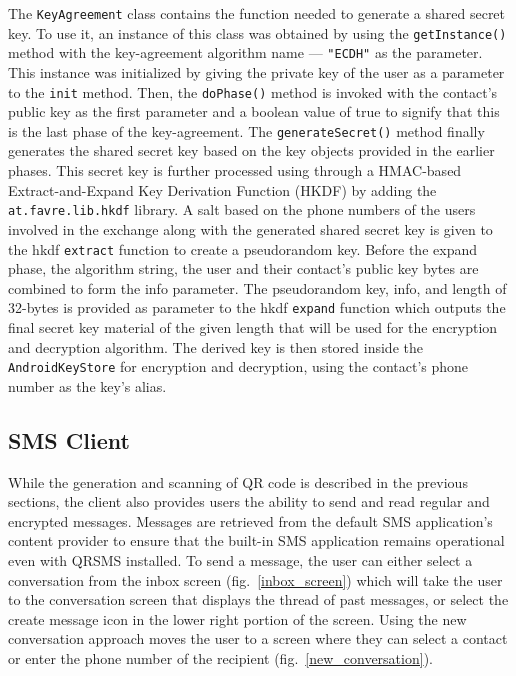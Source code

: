 \documentclass{report}
\begin{document}
The \texttt{KeyAgreement} class contains the function needed to generate a shared secret key. To use it, an instance of this class was obtained by using the \texttt{getInstance()} method with the key-agreement algorithm name --- \texttt{"ECDH"} as the parameter. This instance was initialized by giving the private key of the user as a parameter to the \texttt{init} method. Then, the \texttt{doPhase()} method is invoked with the contact's public key as the first parameter and a boolean value of true to signify that this is the last phase of the key-agreement. The \texttt{generateSecret()} method finally generates the shared secret key based on the key objects provided in the earlier phases. This secret key is further processed using through a HMAC-based Extract-and-Expand Key Derivation Function (HKDF) by adding the \texttt{at.favre.lib.hkdf} library. A salt based on the phone numbers of the users involved in the exchange along with the generated shared secret key is given to the hkdf \texttt{extract} function to create a pseudorandom key. Before the expand phase, the algorithm string, the user and their contact's public key bytes are combined to form the info parameter. The pseudorandom key, info, and length of 32-bytes is provided as parameter to the hkdf \texttt{expand} function which outputs the final secret key material of the given length that will be used for the encryption and decryption algorithm. The derived key is then stored inside the \texttt{AndroidKeyStore} for encryption and decryption, using the contact's phone number as the key's alias.

\subsection{SMS Client}
While the generation and scanning of QR code is described in the previous sections, the client also provides users the ability to send and read regular and encrypted messages.
Messages are retrieved from the default SMS application's content provider to ensure that the built-in SMS application remains operational even with QRSMS installed.
To send a message, the user can either select a conversation from the inbox screen (fig.~\ref{inbox_screen}) which will take the user to the conversation screen that displays the thread of past messages, or select the create message icon in the lower right portion of the screen. Using the new conversation approach moves the user to a screen where they can select a contact or enter the phone number of the recipient (fig.~\ref{new_conversation}).
\end{document}
